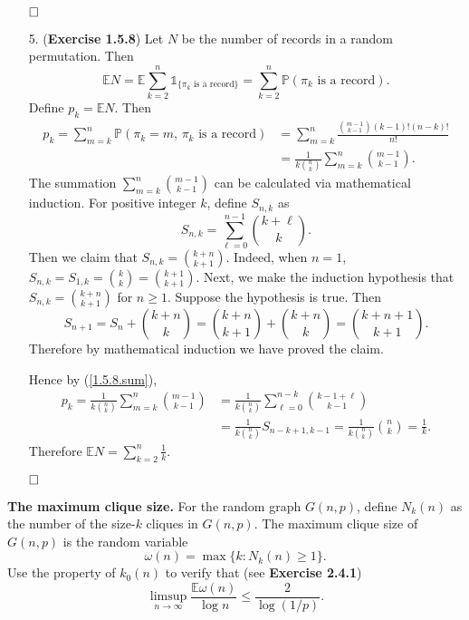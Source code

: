 \documentclass[12pt]{extarticle}
\begin{document}
\begin{enumerate}
$\hspace{\fill}\square$\\
\item[5.] (\textbf{Exercise 1.5.8}) Let $N$ be the number of records in a random permutation.
Then
\[
\mathbb{E}N=\mathbb{E}\sum_{k=2}^n\mathds{1}_{\{\pi_k\text{ is a record}\}}=\sum_{k=2}^n\mathbb{P}(\pi_k\text{ is a record}).
\]
Define $p_k=\mathbb{E}N$. Then
\begin{equation}
\begin{aligned}
p_k = \sum_{m=k}^n\mathbb{P}(\pi_k=m,\,\pi_k\text{ is a record})
&=
\sum_{m=k}^n\frac{\binom{m-1}{k-1}(k-1)!(n-k)!}{n!}
\\&
=
\frac{1}{k\binom{n}{k}}\sum_{m=k}^n\binom{m-1}{k-1}.
\label{1.5.8.sum}
\end{aligned}
\end{equation}
The summation $\sum_{m=k}^n\binom{m-1}{k-1}$ can be calculated via mathematical induction.
For positive integer $k$,
define $S_{n,k}$ as 
\[
S_{n,k} =\sum_{\ell=0}^{n-1}\binom{k+\ell}{k}.
\]
Then we claim that $S_{n,k}=\binom{k+n}{k+1}$.
Indeed, when $n=1$, $S_{n,k}=S_{1,k}=\binom{k}{k}=\binom{k+1}{k+1}$.
Next, we make the induction hypothesis that $S_{n,k}=\binom{k+n}{k+1}$ for $n\geq 1$.
Suppose the hypothesis is true. Then
\[
S_{n+1}=S_n+\binom{k+n}{k}=\binom{k+n}{k+1}+\binom{k+n}{k}=\binom{k+n+1}{k+1}.
\]
Therefore by mathematical induction we have proved the claim.

Hence by (\ref{1.5.8.sum}),
\[
\begin{aligned}
p_k=\frac{1}{k\binom{n}{k}}
\sum_{m=k}^n\binom{m-1}{k-1}
&=
\frac{1}{k\binom{n}{k}}\sum_{\ell=0}^{n-k}\binom{k-1+\ell}{k-1}
\\&=
\frac{1}{k\binom{n}{k}}S_{n-k+1,k-1}
=
\frac{1}{k\binom{n}{k}}\binom{n}{k}
=
\frac{1}{k}.
\end{aligned}
\]
Therefore $\mathbb{E}N=\sum_{k=2}^n\frac{1}{k}$.

$\hspace{\fill}\square$
\end{enumerate}
\textbf{The maximum clique size.} For the random graph $G(n,p)$, define $N_k(n)$ as the number of the size-$k$ cliques in $G(n,p)$. The maximum clique size of $G(n,p)$ is the random variable
\[
\omega(n)=\max\{k:N_k(n)\geq 1\}.
\]
Use the property of $k_0(n)$ to verify that (see \textbf{Exercise 2.4.1})
\[
\limsup_{n\rightarrow\infty}\frac{\mathbb{E}\omega(n)}{\log n}\leq\frac{2}{\log(1/p)}.
\]


\newpage
\end{document}

